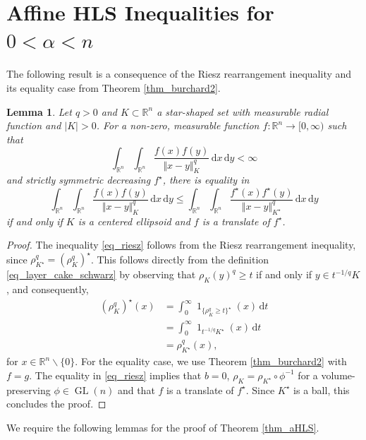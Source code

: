 \documentclass{amsart}
\newtheorem{lemma}[theorem]{Lemma}
\newcommand{\gln}{\operatorname{GL}(n)}
\newcommand{\R}{\mathbb R}
\renewcommand{\d}{\,\mathrm{d}}
\newcommand{\vol}[1]{\vert #1\vert}
\renewcommand{\chi}{\operatorname{1}}
\begin{document}
\section{Affine HLS Inequalities for $0<\alpha<n$}

The following result is a consequence of the Riesz rearrangement inequality and its equality case from Theorem \ref{thm_burchard2}.

\begin{lemma}\label{lem_strict_rearrangement}
Let $q>0$ and $K\subset\R^n$ a star-shaped set with measurable radial function and $\vol{K}>0$.
For a non-zero, measurable function $f:\R^n \to [0,\infty)$ such that
\begin{equation}
\int_{\R^n}\int_{\R^n} \frac{f(x) f(y)}{\Vert x-y\Vert_K^q} \d x \d y<\infty
\end{equation}
and  strictly symmetric decreasing $f^\star$, 
there is equality in
\begin{equation}\label{eq_riesz}
       \int_{\R^n}\int_{\R^n}  \frac{f(x) f(y)}{\Vert x-y\Vert_K^q} \d x \d y \leq \int_{\R^n}\int_{\R^n} \frac{f^\star(x) f^\star(y)}{\Vert x-y\Vert_{K^\star}^q} \d x \d y
\end{equation}
if and only if $K$ is a centered ellipsoid and $f$ is a  translate of $f^\star$.
\end{lemma}
\begin{proof}
The inequality \eqref{eq_riesz} follows from the Riesz rearrangement inequality, since $\rho_{K^\star}^q = ( \rho_K^q)^\star$. This follows directly from the definition \eqref{eq_layer_cake_schwarz} by observing that $\rho_K(y)^q \geq t$ if and only if $y \in t^{-1/q} K$, and consequently,
    \begin{align}
        (\rho_K^q)^\star(x)
        &= \int_0^\infty \chi_{\{\rho_K^q \geq t\}^\star} (x) \d t \\
        &= \int_0^\infty \chi_{t^{-1/q} K^\star} (x) \d t \\
        &= \rho^q_{K^\star}(x),
    \end{align}
for $x\in\R^n\backslash\{0\}$. For the equality case, we use Theorem \ref{thm_burchard2} with $f=g$. The equality in \eqref{eq_riesz} implies that $b=0$, $\rho_K=\rho_{K^\star}\circ \phi^{-1}$ for a volume-preserving $\phi\in\gln$ and that $f$ is a translate of $f^\star$. Since $K^\star$ is a ball, this concludes the proof. 
\end{proof}

\goodbreak
We require the following lemmas for the proof of Theorem \ref{thm_aHLS}.
\end{document}
